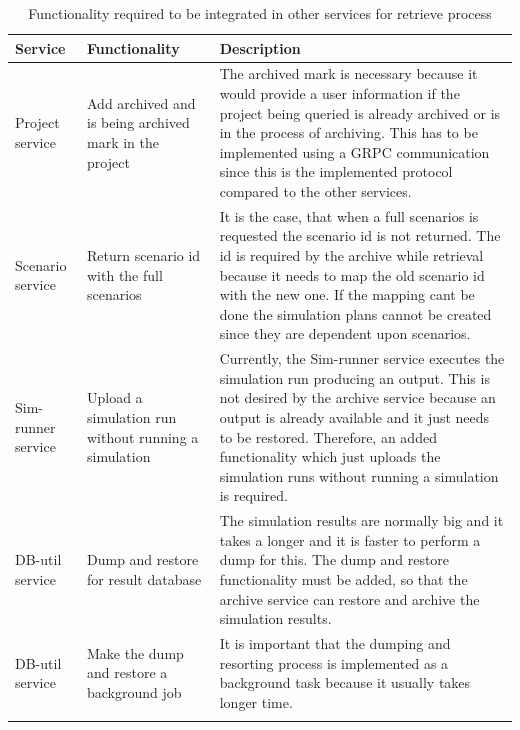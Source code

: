     \begin{longtable}{|p{2cm}|p{6cm}|p{6cm}|}
        \hline
            \textbf{Service}  & \textbf{Functionality} & \textbf{Description}\\
        \hline
            Project service & Add archived and is being archived mark in the project &  The archived mark is necessary because
            it would provide a user information if the project being queried is already archived or is in the process of archiving. This has to be
            implemented using a GRPC communication since this is the implemented protocol compared to the other services.  \\
        \hline
            Scenario service & Return scenario id with the full scenarios & It is the case, that when a full scenarios is requested the scenario id is
            not returned. The id is required by the archive while retrieval because it needs to map the old scenario id with the new one. If the mapping
            cant be done the simulation plans cannot be created since they are dependent upon scenarios.\\
        \hline
            Sim-runner service & Upload a simulation run without running a simulation & Currently, the Sim-runner service executes the simulation run producing an
            output. This is not desired by the archive service because an output is already available and it just needs to be restored. Therefore, an added 
            functionality which just uploads the simulation runs without running a simulation is required.\\
        \hline
            DB-util service & Dump and restore for result database & The simulation results are normally big and it takes a longer and it is faster to
            perform a dump for this. The dump and restore functionality must be added, so that the archive service can restore and archive the simulation results.\\
        \hline
            DB-util service & Make the dump and restore a background job & It is important that the dumping and resorting process is implemented as a background task
            because it usually takes longer time.\\

        \hline
        \caption{Functionality required to be integrated in other services for retrieve process}
        \label{table:funcRestore} 
    \end{longtable}

